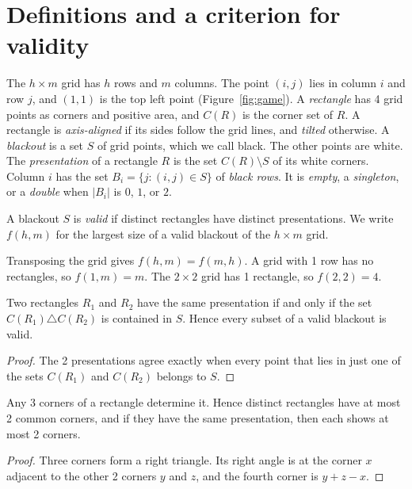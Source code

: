 \section{Definitions and a criterion for validity}\label{sec:prelim}

The $h\times m$ grid has $h$ rows and $m$ columns. The point $(i,j)$ lies in column $i$
and row $j$, and $(1,1)$ is the top left point (Figure~\ref{fig:game}). A \emph{rectangle}
has 4 grid points as corners and positive area, and $C(R)$ is the corner set of $R$. A
rectangle is \emph{axis-aligned} if its sides follow the grid lines, and \emph{tilted}
otherwise. A \emph{blackout} is a set $S$ of grid points, which we call black. The other
points are white. The \emph{presentation} of a rectangle $R$ is the set $C(R)\setminus S$
of its white corners. Column $i$ has the set $B_i=\{j:(i,j)\in S\}$ of \emph{black rows}.
It is \emph{empty}, a \emph{singleton}, or a \emph{double} when $|B_i|$ is $0$, $1$, or
$2$.

\begin{definition}\label{def:valid}
A blackout $S$ is \emph{valid} if distinct rectangles have distinct presentations. We write
$f(h,m)$ for the largest size of a valid blackout of the $h\times m$ grid.
\end{definition}

Transposing the grid gives $f(h,m)=f(m,h)$. A grid with 1 row has no rectangles, so
$f(1,m)=m$. The $2\times2$ grid has 1 rectangle, so $f(2,2)=4$.

\begin{lemma}\label{lem:diff}
Two rectangles $R_1$ and $R_2$ have the same presentation if and only if the set
$C(R_1)\triangle C(R_2)$ is contained in $S$. Hence every subset of a valid blackout is
valid.
\end{lemma}

\begin{proof}
The 2 presentations agree exactly when every point that lies in just one of the sets
$C(R_1)$ and $C(R_2)$ belongs to $S$.
\end{proof}

\begin{lemma}\label{lem:threecorners}
Any 3 corners of a rectangle determine it. Hence distinct rectangles have at most 2 common
corners, and if they have the same presentation, then each shows at most 2 corners.
\end{lemma}

\begin{proof}
Three corners form a right triangle. Its right angle is at the corner $x$ adjacent to the
other 2 corners $y$ and $z$, and the fourth corner is $y+z-x$.
\end{proof}

